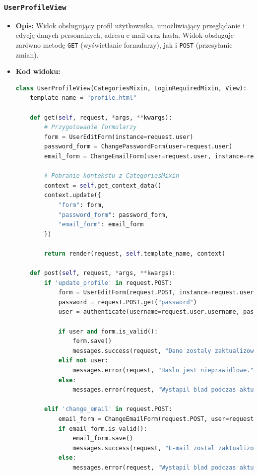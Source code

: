 \documentclass[12pt,a4paper,oneside]{article}
\theoremstyle{definition}
\numberwithin{equation}{section}
\begin{document}
\subsubsection*{\texttt{UserProfileView}}
    \begin{itemize}
        \item \textbf{Opis:} Widok obsługujący profil użytkownika, umożliwiający przeglądanie i edycję danych personalnych, adresu e-mail oraz hasła. Widok obsługuje zarówno metodę \texttt{GET} (wyświetlanie formularzy), jak i \texttt{POST} (przesyłanie zmian).
        \item \textbf{Kod widoku:}
    \begin{lstlisting}[language=Python, caption=\texttt{UserProfileView}]
class UserProfileView(CategoriesMixin, LoginRequiredMixin, View):
    template_name = "profile.html"

    def get(self, request, *args, **kwargs):
        # Przygotowanie formularzy
        form = UserEditForm(instance=request.user)
        password_form = ChangePasswordForm(user=request.user)
        email_form = ChangeEmailForm(user=request.user, instance=request.user)

        # Pobranie kontekstu z CategoriesMixin
        context = self.get_context_data()
        context.update({
            "form": form,
            "password_form": password_form,
            "email_form": email_form
        })

        return render(request, self.template_name, context)

    def post(self, request, *args, **kwargs):
        if 'update_profile' in request.POST:
            form = UserEditForm(request.POST, instance=request.user)
            password = request.POST.get("password")
            user = authenticate(username=request.user.username, password=password)

            if user and form.is_valid():
                form.save()
                messages.success(request, "Dane zostaly zaktualizowane.")
            elif not user:
                messages.error(request, "Haslo jest nieprawidlowe.")
            else:
                messages.error(request, "Wystapil blad podczas aktualizacji.")

        elif 'change_email' in request.POST:
            email_form = ChangeEmailForm(request.POST, user=request.user, instance=request.user)
            if email_form.is_valid():
                email_form.save()
                messages.success(request, "E-mail zostal zaktualizowany.")
            else:
                messages.error(request, "Wystapil blad podczas aktualizacji e-maila.")


\end{lstlisting}
\end{itemize}
\end{document}
